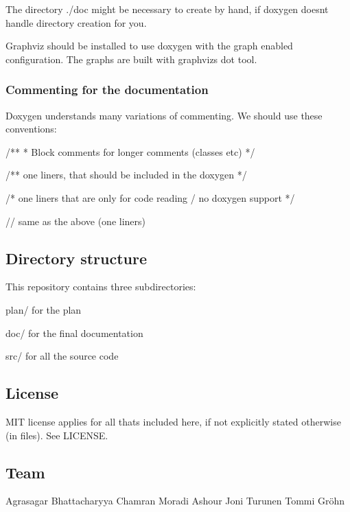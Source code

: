 The directory ./doc might be necessary to create by hand, if doxygen doesn\textquotesingle{}t handle directory creation for you.

Graphviz should be installed to use doxygen with the graph enabled configuration. The graphs are built with graphviz\textquotesingle{}s dot tool.

\subsubsection*{Commenting for the documentation}

Doxygen understands many variations of commenting. We should use these conventions\+: \begin{DoxyVerb}/**
 * Block comments for longer comments (classes etc)
 */

/** one liners, that should be included in the doxygen */

/* one liners that are only for code reading / no doxygen support */

// same as the above (one liners)
\end{DoxyVerb}






\subsection*{Directory structure}

This repository contains three subdirectories\+:


\begin{DoxyItemize}
\item plan/ for the plan
\item doc/ for the final documentation
\item src/ for all the source code 


\end{DoxyItemize}

\subsection*{License}

M\+I\+T license applies for all that\textquotesingle{}s included here, if not explicitly stated otherwise (in files). See L\+I\+C\+E\+N\+S\+E. 



\subsection*{Team}

Agrasagar Bhattacharyya Chamran Moradi Ashour Joni Turunen Tommi Gröhn 